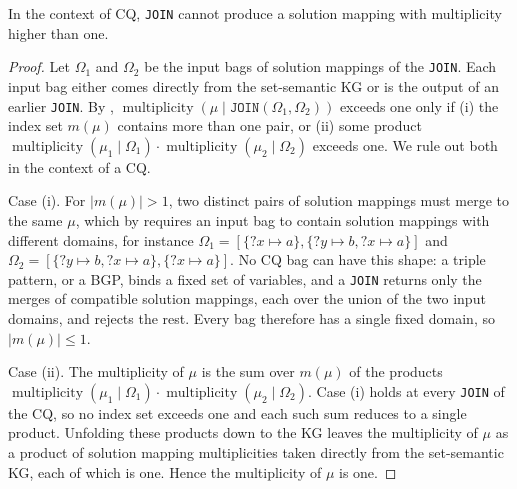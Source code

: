 \documentclass[../main]{subfiles}
\begin{document}
\begin{proposition}\label{prop_cq_join_no_dup}
In the context of \ac{CQ}, \texttt{JOIN} cannot produce a solution mapping with multiplicity higher than one.
\end{proposition}

\begin{proof}
Let $\Omega_1$ and $\Omega_2$ be the input bags of solution mappings of the \texttt{JOIN}.
Each input bag either comes directly from the set-semantic \ac{KG} or is the output of an earlier \texttt{JOIN}.
By , $\operatorname{multiplicity}(\mu \mid \texttt{JOIN}(\Omega_1, \Omega_2))$ exceeds one only if (i) the index set $m(\mu)$ contains more than one pair, or (ii) some product $\operatorname{multiplicity}(\mu_1 \mid \Omega_1) \cdot \operatorname{multiplicity}(\mu_2 \mid \Omega_2)$ exceeds one.
We rule out both in the context of a \ac{CQ}.

Case (i).
For $|m(\mu)| > 1$, two distinct pairs of solution mappings must merge to the same $\mu$, which by  requires an input bag to contain solution mappings with different domains, for instance $\Omega_1 = [\{?x \mapsto a\}, \{?y \mapsto b, ?x \mapsto a\}]$ and $\Omega_2 = [ \{?y \mapsto b, ?x \mapsto a\}, \{?x \mapsto a\}]$.
No \ac{CQ} bag can have this shape: a triple pattern, or a \ac{BGP}, binds a fixed set of variables, and a \texttt{JOIN} returns only the merges of compatible solution mappings, each over the union of the two input domains, and rejects the rest.
Every bag therefore has a single fixed domain, so $|m(\mu)| \leq 1$.

Case (ii).
The multiplicity of $\mu$ is the sum over $m(\mu)$ of the products $\operatorname{multiplicity}(\mu_1 \mid \Omega_1) \cdot \operatorname{multiplicity}(\mu_2 \mid \Omega_2)$.
Case (i) holds at every \texttt{JOIN} of the \ac{CQ}, so no index set exceeds one and each such sum reduces to a single product.
Unfolding these products down to the \ac{KG} leaves the multiplicity of $\mu$ as a product of solution mapping multiplicities taken directly from the set-semantic \ac{KG}, each of which is one.
Hence the multiplicity of $\mu$ is one.
\end{proof}
\end{document}
